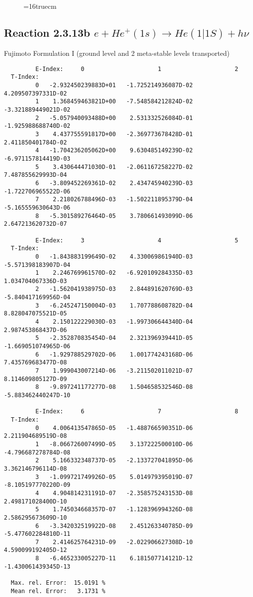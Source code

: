 \documentclass[12pt]{article}
\begin{document}
\begin{figure} \label{2.3.13a}
\epsfxsize=16truecm
\end{figure}
\newpage
\subsection{
Reaction 2.3.13b  $e + He^+(1s) \rightarrow He(1|1S) + h\nu$
}

 Fujimoto Formulation I (ground level and 2 meta-stable levels transported)


\begin{small}\begin{verbatim}
         E-Index:     0                     1                     2
  T-Index:
         0   -2.932450239883D+01   -1.725214936087D-02    4.209507397331D-02
         1    1.368459463821D+00   -7.548584212824D-02   -3.321889449021D-02
         2   -5.057940093488D+00    2.531332526084D-01   -1.925988688740D-02
         3    4.437755591817D+00   -2.369773678428D-01    2.411850401784D-02
         4   -1.704236205062D+00    9.630485149239D-02   -6.971157814419D-03
         5    3.430644471030D-01   -2.061167258227D-02    7.487855629993D-04
         6   -3.809452269361D-02    2.434745940239D-03   -1.722706965522D-06
         7    2.218026788496D-03   -1.502211895379D-04   -5.165559630643D-06
         8   -5.301589276464D-05    3.780661493099D-06    2.647213620732D-07

         E-Index:     3                     4                     5
  T-Index:
         0   -1.843883199649D-02    4.330069861940D-03   -5.571398183907D-04
         1    2.246769961570D-02   -6.920109284335D-03    1.034704067336D-03
         2   -1.562041938975D-03    2.844891620769D-03   -5.840417169956D-04
         3   -6.245247150004D-03    1.707788608782D-04    8.828047075521D-05
         4    2.150122229030D-03   -1.997306644340D-04    2.987453868437D-06
         5   -2.352870835454D-04    2.321396939441D-05   -1.669051074965D-06
         6   -1.929788529702D-06    1.001774243168D-06    7.435769683477D-08
         7    1.999043007214D-06   -3.211502011021D-07    8.114609805127D-09
         8   -9.897241177277D-08    1.504658532546D-08   -5.883462440247D-10

         E-Index:     6                     7                     8
  T-Index:
         0    4.006413547865D-05   -1.488766590351D-06    2.211904689519D-08
         1   -8.066726007499D-05    3.137222500010D-06   -4.796687278784D-08
         2    5.166332348737D-05   -2.133727041895D-06    3.362146796114D-08
         3   -1.099721749926D-05    5.014979395019D-07   -8.105197770220D-09
         4    4.904814231191D-07   -2.358575243153D-08    2.498171028400D-10
         5    1.745034668357D-07   -1.128396994326D-08    2.586295673609D-10
         6   -3.342032519922D-08    2.451263340785D-09   -5.477602284810D-11
         7    2.414625764231D-09   -2.022906627308D-10    4.590099192405D-12
         8   -6.465233005227D-11    6.181507714121D-12   -1.430061439345D-13

  Max. rel. Error:  15.0191 %
  Mean rel. Error:   3.1731 %

\end{verbatim}\end{small}
\end{document}
